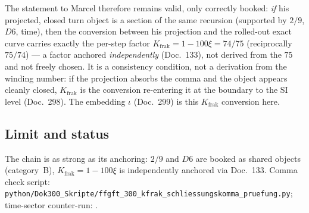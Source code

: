 The statement to Marcel therefore remains valid, only correctly booked:
\emph{if} his projected, closed turn object is a section of the same recursion
(supported by $2/9$, $D6$, time), then the conversion between his projection and
the rolled-out exact curve carries exactly the per-step factor
$K_{\text{frak}}=1-100\xi=74/75$ (reciprocally $75/74$) --- a factor anchored
\emph{independently} (Doc.~133), not derived from the $75$ and not freely
chosen. It is a consistency condition, not a derivation from the winding
number: if the projection absorbs the comma and the object appears cleanly
closed, $K_{\text{frak}}$ is the conversion re-entering it at the boundary to
the SI level (Doc.~298). The embedding $\iota$ (Doc.~299) is this
$K_{\text{frak}}$ conversion here.

\subsection*{Limit and status}

The chain is as strong as its anchoring: $2/9$ and $D6$ are booked as shared
objects (category~B), $K_{\text{frak}}=1-100\xi$ is independently anchored via
Doc.~133. Comma check script:
\texttt{python/Dok300\_Skripte/ffgft\_300\_kfrak\_schliessungskomma\_pruefung.py};
time-sector counter-run: .
